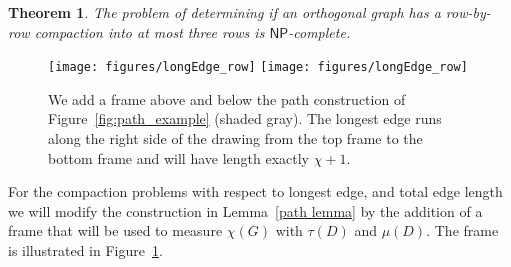 \documentclass[12pt]{article}
\newtheorem{theorem}{Theorem}
\theoremstyle{definitions}
\newcommand{\NP}{\mathsf{NP}}
\begin{document}
\begin{theorem}
The problem of determining if an orthogonal graph has a row-by-row compaction into at most three rows is $\NP$-complete.
\end{theorem}


\begin{figure}[ht]
\centering
\ifFull
\texttt{[image: figures/longEdge\_row]}
\else
\texttt{[image: figures/longEdge\_row]}
\fi
\caption{
\label{fig:path_example_edgeLength}
We add a frame above and below the path construction of Figure~\ref{fig:path_example}
(shaded gray). The longest edge runs along the right side of the drawing from the top
frame to the bottom frame and will have length exactly $\chi + 1$.}
\end{figure}

For the compaction problems with respect to longest edge, and total edge length we will modify the construction in Lemma~\ref{path lemma} by the addition of a frame that will be used to measure $\chi(G)$ with $\tau(D)$ and $\mu(D)$. The frame is illustrated in Figure~\ref{fig:path_example_edgeLength}.
\end{document}
